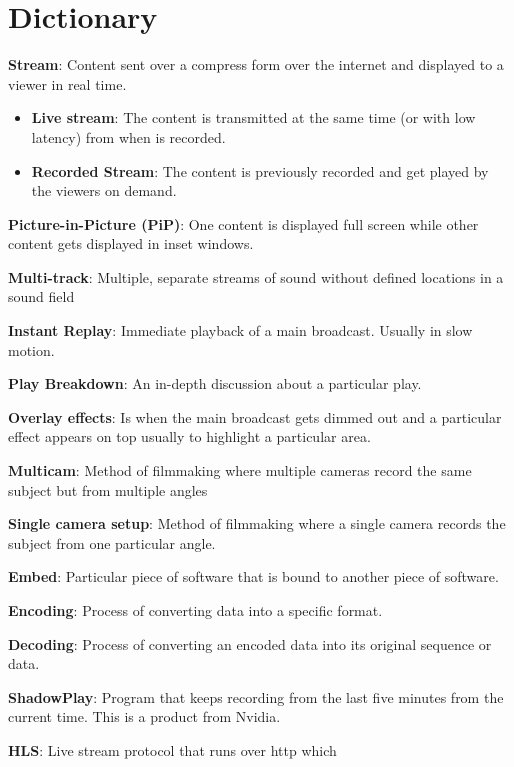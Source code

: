 \section{Dictionary}
\begin{packed_dict}
	\item \textbf{Stream}: Content sent over a compress form over the internet 
	and displayed to a viewer in real time.
	\begin{itemize}
		\item \textbf{Live stream}: The content is transmitted at the same time 
		(or with low latency) from when is recorded.
		\item \textbf{Recorded Stream}: The content is previously recorded 
		and get played by the viewers on demand.
	\end{itemize}
	\item \textbf{Picture-in-Picture (PiP)}: One content is displayed full 
	screen while other content gets displayed in inset windows.
	\item \textbf{Multi-track}: Multiple, separate streams of sound without 
	defined locations in a sound field
	\item \textbf{Instant Replay}: Immediate playback of a main broadcast. 
	Usually in slow motion.
	\item \textbf{Play Breakdown}: An in-depth discussion about a particular 
	play.
	\item \textbf{Overlay effects}: Is when the main broadcast gets dimmed 
	out and a particular effect appears on top usually to highlight a 
	particular area.
	\item \textbf{Multicam}: Method of filmmaking where multiple cameras 
	record the same subject but from multiple angles
	\item \textbf{Single camera setup}: Method of filmmaking where a single 
	camera records the subject from one particular angle.
	\item \textbf{Embed}: Particular piece of software that is bound to 
	another piece of software.
	\item \textbf{Encoding}: Process of converting data into a specific 
	format.
	\item \textbf{Decoding}: Process of converting an encoded data into its 
	original sequence or data.
	\item \textbf{ShadowPlay}: Program that keeps recording from the last 
	five minutes from the current time. This is a product from Nvidia.
	\item \textbf{HLS}: Live stream protocol that runs over http which 

\end{packed_dict}
